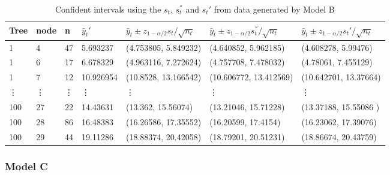 \begin{table}[H]
	\caption{Confident intervals using the $s_t$, $s^{''}_t$ and $s_t'$ from data generated by Model B  }
	\begin{tiny}
		\begin{tabular}{ |p{1cm}|p{1cm}|p{1cm}|p{1.7cm}|p{3cm}|p{3cm}|p{3cm}|}%
			\hline
			Tree    &node  &n   &$\bar{y}_{t}'$ &$\bar{y}_t \pm z_{1-\alpha/2} s_t /\sqrt{n_t}$&$\bar{y}_t \pm z_{1-\alpha/2} s^{''}_t /\sqrt{n_t}$ &$\bar{y}_t \pm z_{1-\alpha/2} s_t' /\sqrt{n_t}$\\
			\hline
			1&	4&	47&5.693237	&(4.753805,	5.849232)&	(4.640852,	5.962185)&	(4.608278,	5.99476)\\

			1&	6&	17&6.678329	&(4.963116,	7.272624)&	(4.757708,	7.478032)&	(4.78061,	7.455129)\\

			1&	7&	12&10.926954&(10.8528,	13.166542)&	(10.606772,	13.412569)&	(10.642701,	13.37664)\\
			\vdots & \vdots & \vdots & \vdots & \vdots & \vdots  & \vdots\\%
			100&	27&	22&14.43631	&(13.362,	15.56074)&(13.21046,	15.71228)&	(13.37188,	15.55086
)\\
			100&	28&	86&16.48383	&(16.26586,	17.35552)&(16.20599,	17.4154)& (16.23062,	17.39076)\\

			100&	29&	44&19.11286	&(18.88374,	20.42058)&(18.79201,	20.51231)&	(18.86674,	20.43759)\\
			\hline
		\end{tabular}
		\label{est:B}
	\end{tiny}
\end{table}



\subsubsection{Model C}

\vspace{0.1in}

